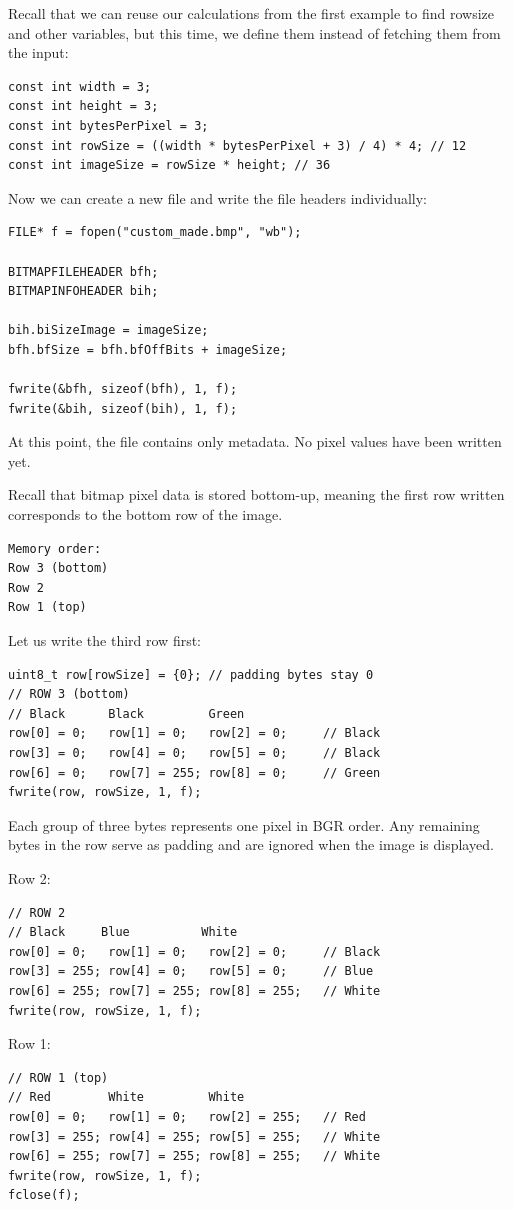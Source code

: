 Recall that we can reuse our calculations from the first example to find rowsize and other variables, but this time, we define them instead of fetching them from the input:
\begin{verbatim}
const int width = 3;
const int height = 3;
const int bytesPerPixel = 3;
const int rowSize = ((width * bytesPerPixel + 3) / 4) * 4; // 12
const int imageSize = rowSize * height; // 36
\end{verbatim}

Now we can create a new file and write the file headers individually:
\begin{verbatim}
FILE* f = fopen("custom_made.bmp", "wb");

BITMAPFILEHEADER bfh;
BITMAPINFOHEADER bih;

bih.biSizeImage = imageSize;
bfh.bfSize = bfh.bfOffBits + imageSize;

fwrite(&bfh, sizeof(bfh), 1, f);
fwrite(&bih, sizeof(bih), 1, f);
\end{verbatim}
At this point, the file contains only metadata. No pixel values have been written yet.

Recall that bitmap pixel data is stored bottom-up, meaning the first row written corresponds to the bottom row of the image.
\begin{verbatim}
Memory order:
Row 3 (bottom)
Row 2
Row 1 (top)
\end{verbatim}

Let us write the third row first:
\begin{verbatim}
uint8_t row[rowSize] = {0}; // padding bytes stay 0
// ROW 3 (bottom)
// Black      Black         Green 
row[0] = 0;   row[1] = 0;   row[2] = 0;     // Black
row[3] = 0;   row[4] = 0;   row[5] = 0;     // Black
row[6] = 0;   row[7] = 255; row[8] = 0;     // Green
fwrite(row, rowSize, 1, f);
\end{verbatim}
Each group of three bytes represents one pixel in BGR order. Any remaining bytes in the row serve as padding and are ignored when the image is displayed.

Row 2:
\begin{verbatim}
// ROW 2
// Black     Blue          White 
row[0] = 0;   row[1] = 0;   row[2] = 0;     // Black
row[3] = 255; row[4] = 0;   row[5] = 0;     // Blue
row[6] = 255; row[7] = 255; row[8] = 255;   // White
fwrite(row, rowSize, 1, f);
\end{verbatim}

Row 1:
\begin{verbatim}
// ROW 1 (top)
// Red        White         White
row[0] = 0;   row[1] = 0;   row[2] = 255;   // Red
row[3] = 255; row[4] = 255; row[5] = 255;   // White
row[6] = 255; row[7] = 255; row[8] = 255;   // White
fwrite(row, rowSize, 1, f);
fclose(f);
\end{verbatim}

